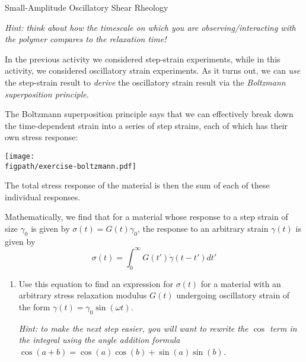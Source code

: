 \begin{activity}[extension]{Small-Amplitude Oscillatory Shear Rheology}
\begin{exercises}
\begin{enumerate}
			\emph{Hint: think about how the timescale on which you are observing/interacting with the polymer compares to the relaxation time!}
	
					\begin{solution}\end{solution}
					
		\end{enumerate}

		\exercise \label{\labelbase:exc:Boltzmann} In the previous activity we considered step-strain experiments, while in this activity, we considered oscillatory strain experiments.  As it turns out, we can \emph{use} the step-strain result to \emph{derive} the oscillatory strain result via the \emph{Boltzmann superposition principle}.
		
			The Boltzmann superposition principle says that we can effectively break down the time-dependent strain into a series of step strains, each of which has their own stress response:
				
		\centerline{\texttt{[image: \\figpath/exercise-boltzmann.pdf]}}
			
			The total stress response of the material is then the sum of each of these individual responses.
			
			Mathematically, we find that for a material whose response to a step strain of size $\gamma_0$ is given by $\sigma(t) = G(t)\gamma_0$, the response to an arbitrary strain $\gamma(t)$ is given by
			\begin{equation*}
				\sigma(t) = \int_0^{\infty} G(t') \dot\gamma(t-t') dt'
			\end{equation*}
		
			\begin{enumerate}
			
				\item Use this equation to find an expression for $\sigma(t)$ for a material with an arbitrary stress relaxation modulus $G(t)$ undergoing oscillatory strain of the form $\gamma(t) = \gamma_0 \sin(\omega t)$.
				
					\emph{Hint: to make the next step easier, you will want to rewrite the $\cos$ term in the integral using the angle addition formula $\cos(a+b) = \cos(a)\cos(b) + \sin(a)\sin(b)$.}
				

\end{enumerate}
\end{exercises}
\end{activity}
